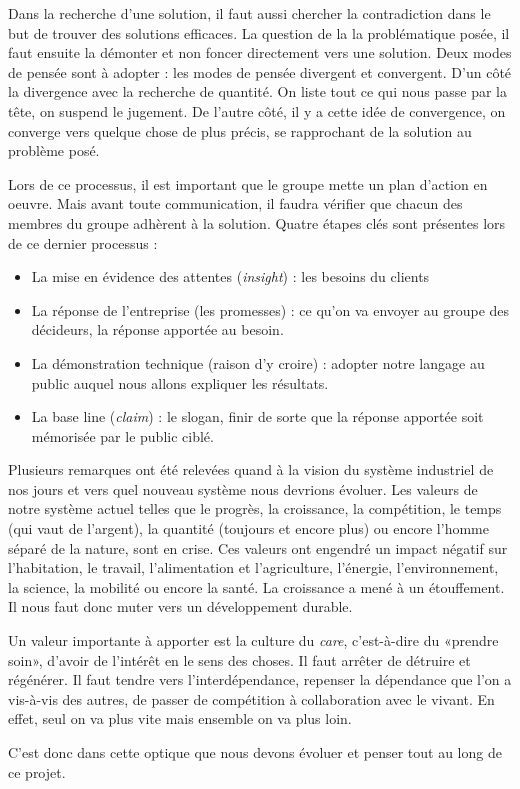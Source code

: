 Dans la recherche d'une solution, il faut aussi chercher la contradiction dans le but de trouver des solutions efficaces. La question de la la problématique posée, il faut ensuite la démonter et non foncer directement vers une solution.
Deux modes de pensée sont à adopter : les modes de pensée divergent et convergent. D'un côté la divergence avec la recherche de quantité. On liste tout ce qui nous passe par la tête, on suspend le jugement. De l'autre côté, il y a cette idée de convergence, on converge vers quelque chose de plus précis, se rapprochant de la solution au problème posé.

Lors de ce processus, il est important que le groupe mette un plan d'action en oeuvre. Mais avant toute communication, il faudra vérifier que chacun des membres du groupe adhèrent à la solution. Quatre étapes clés sont présentes lors de ce dernier processus :
\begin{itemize}
\item La mise en évidence des attentes (\emph{insight}) : les besoins du clients
\item La réponse de l'entreprise (les promesses) : ce qu'on va envoyer au groupe des décideurs, la réponse apportée au besoin.
\item La démonstration technique (raison d'y croire) : adopter notre langage au public auquel nous allons expliquer les résultats.
\item La base line (\emph{claim}) : le slogan, finir de sorte que la réponse apportée soit mémorisée par le public ciblé.
\end{itemize}

Plusieurs remarques ont été relevées quand à la vision du système industriel de nos jours et vers quel nouveau système nous devrions évoluer.
Les valeurs de notre système actuel telles que le progrès, la croissance, la compétition, le temps (qui vaut de l'argent), la quantité (toujours et encore plus) ou encore l'homme séparé de la nature, sont en crise. Ces valeurs ont engendré un impact négatif sur l'habitation, le travail, l'alimentation et l'agriculture, l'énergie, l'environnement, la science, la mobilité ou encore la santé. La croissance a mené à un étouffement. Il nous faut donc muter vers un développement durable.

Un valeur importante à apporter est la culture du \emph{care}, c'est-à-dire du «prendre soin», d'avoir de l'intérêt en le sens des choses. Il faut arrêter de détruire et régénérer.
Il faut tendre vers l'interdépendance, repenser la dépendance que l'on a vis-à-vis des autres, de passer de compétition à collaboration avec le vivant. En effet, seul on va plus vite mais ensemble on va plus loin.

C'est donc dans cette optique que nous devons évoluer et penser tout au long de ce projet.
